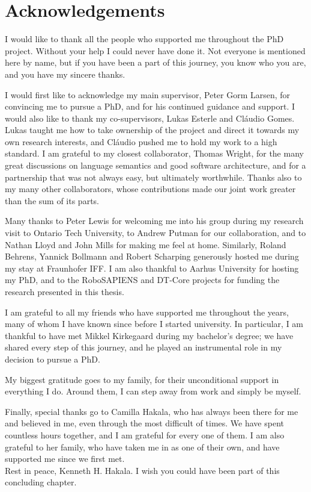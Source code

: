 
\chapter*{Acknowledgements}
{}
I would like to thank all the people who supported me throughout the PhD project.
Without your help I could never have done it.
Not everyone is mentioned here by name, but if you have been a part of this journey, you know who you are, and you have my sincere thanks.

I would first like to acknowledge my main supervisor, Peter Gorm Larsen, for convincing me to pursue a PhD, and for his continued guidance and support.
I would also like to thank my co-supervisors, Lukas Esterle and Cl\'{a}udio Gomes.
Lukas taught me how to take ownership of the project and direct it towards my own research interests, and Cl\'{a}udio pushed me to hold my work to a high standard.
I am grateful to my closest collaborator, Thomas Wright, for the many great discussions on language semantics and good software architecture, and for a partnership that was not always easy, but ultimately worthwhile.
Thanks also to my many other collaborators, whose contributions made our joint work greater than the sum of its parts.

Many thanks to Peter Lewis for welcoming me into his group during my research visit to Ontario Tech University, to Andrew Putman for our collaboration, and to Nathan Lloyd and John Mills for making me feel at home.
Similarly, Roland Behrens, Yannick Bollmann and Robert Scharping generously hosted me during my stay at Fraunhofer IFF.
I am also thankful to Aarhus University for hosting my PhD, and to the RoboSAPIENS and DT-Core projects for funding the research presented in this thesis.

I am grateful to all my friends who have supported me throughout the years, many of whom I have known since before I started university.
In particular, I am thankful to have met Mikkel Kirkegaard during my bachelor's degree; we have shared every step of this journey, and he played an instrumental role in my decision to pursue a PhD.

My biggest gratitude goes to my family, for their unconditional support in everything I do.
Around them, I can step away from work and simply be myself.

Finally, special thanks go to Camilla Hakala, who has always been there for me and believed in me, even through the most difficult of times.
We have spent countless hours together, and I am grateful for every one of them.
I am also grateful to her family, who have taken me in as one of their own, and have supported me since we first met.\\
Rest in peace, Kenneth H. Hakala.
I wish you could have been part of this concluding chapter.

